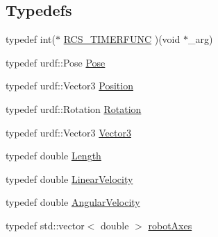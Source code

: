 \subsection*{Typedefs}
\begin{DoxyCompactItemize}
\item 
typedef int($\ast$ \hyperlink{namespaceRCS_ae5dd02ab24956844fae02f10de954ad5}{R\-C\-S\-\_\-\-T\-I\-M\-E\-R\-F\-U\-N\-C} )(void $\ast$\-\_\-arg)
\item 
typedef urdf\-::\-Pose \hyperlink{namespaceRCS_aac02c0fd845140ea93a2a9254b1db6f6}{Pose}
\item 
typedef urdf\-::\-Vector3 \hyperlink{namespaceRCS_afde073114b0dbe5587b2ec83fad48085}{Position}
\item 
typedef urdf\-::\-Rotation \hyperlink{namespaceRCS_ae84bcdeffa185f35100e9eca768bd4db}{Rotation}
\item 
typedef urdf\-::\-Vector3 \hyperlink{namespaceRCS_a3d2e4673086277ee114b9f01ba1664e7}{Vector3}
\item 
typedef double \hyperlink{namespaceRCS_a86ac9427c1a3f2ec2b94a74888b2cefd}{Length}
\item 
typedef double \hyperlink{namespaceRCS_a20e104cd075c4ca08a073a6261a70a84}{Linear\-Velocity}
\item 
typedef double \hyperlink{namespaceRCS_a3ca212cf7a0c547f5496352e850372a9}{Angular\-Velocity}
\item 
typedef std\-::vector$<$ double $>$ \hyperlink{namespaceRCS_a3185cefb4d61f5c6f364aaf5624a3ee4}{robot\-Axes}
\end{DoxyCompactItemize}
